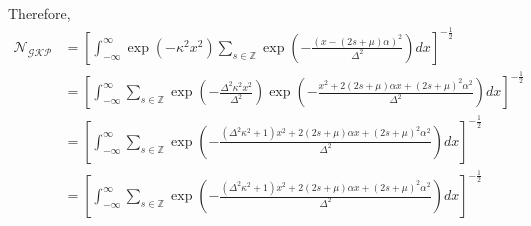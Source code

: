 \documentclass[11pt]{article}
\begin{document}
Therefore,
\begin{align*}
    \mathcal{N_{\text{GKP}}} & = \left[\int_{-\infty}^{\infty} \exp\!\left(-\kappa^2 x^2\right)
        \sum_{s \in \mathbb{Z}}
    \exp\!\left(-\frac{(x - (2s + \mu)\alpha)^2}{\Delta^2}\right) dx\right]^{-\frac{1}{2}}                                                                                                                                 \\
                             & = \left[\int_{-\infty}^{\infty} \sum_{s \in \mathbb{Z}} \exp\!\left(-\frac{\Delta^2 \kappa^2 x^2}{\Delta^2}\right)
    \exp\!\left(-\frac{x^2 + 2(2s+\mu)\alpha x + (2s+\mu)^2 \alpha^2}{\Delta^2}\right) dx\right]^{-\frac{1}{2}}                                                                                                            \\
                             & = \left[\int_{-\infty}^{\infty} \sum_{s \in \mathbb{Z}} \exp\!\left(-\frac{(\Delta^2 \kappa^2 + 1) x^2 + 2(2s+\mu)\alpha x + (2s+\mu)^2 \alpha^2}{\Delta^2}\right) dx\right]^{-\frac{1}{2}} \\
                             & = \left[\int_{-\infty}^{\infty} \sum_{s \in \mathbb{Z}} \exp\!\left(-\frac{(\Delta^2 \kappa^2 + 1) x^2 + 2(2s+\mu)\alpha x + (2s+\mu)^2 \alpha^2}{\Delta^2}\right) dx\right]^{-\frac{1}{2}} \\
\end{align*}
\end{document}
